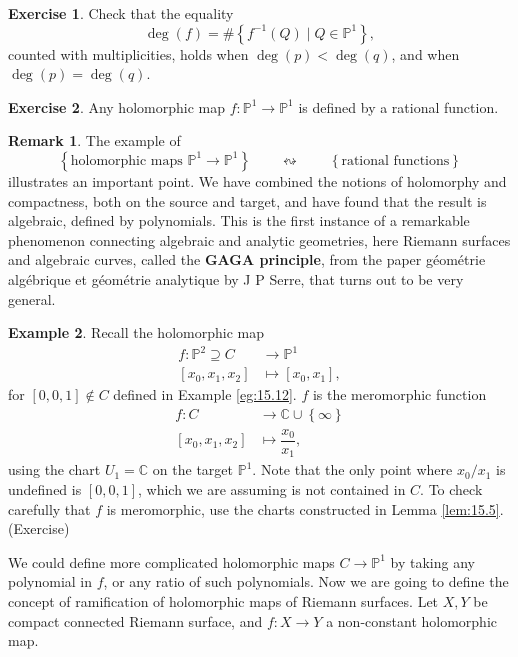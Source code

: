 \documentclass{article}
\newcommand{\C}{\mathbb{C}}
\renewcommand{\P}{\mathbb{P}}
\newcommand{\rb}[1]{\left( #1 \right)}
\renewcommand{\sb}[1]{\left[ #1 \right]}
\newcommand{\cb}[1]{\left\{ #1 \right\}}
\theoremstyle{definition}\newtheorem{definition}{Definition}[section]
\theoremstyle{definition}\newtheorem{notation}[definition]{Notation}
\theoremstyle{definition}\newtheorem{remark}[definition]{Remark}
\theoremstyle{definition}\newtheorem{example1}[definition]{Example}
\theoremstyle{definition}\newtheorem{fact}{Fact}
\theoremstyle{definition}\newtheorem{exercise}{Exercise}
\theoremstyle{definition}\newtheorem*{example2}{Example}
\begin{document}
\begin{exercise}
Check that the equality
$$ \deg\rb{f} = \#\cb{f^{-1}\rb{Q} \mid Q \in \P^1}, $$
counted with multiplicities, holds when $ \deg\rb{p} < \deg\rb{q} $, and when $ \deg\rb{p} = \deg\rb{q} $.
\end{exercise}

\begin{exercise}
Any holomorphic map $ f : \P^1 \to \P^1 $ is defined by a rational function.
\end{exercise}

\begin{remark}
The example of
$$ \cb{\text{holomorphic maps } \P^1 \to \P^1} \qquad \leftrightsquigarrow \qquad \cb{\text{rational functions}} $$
illustrates an important point. We have combined the notions of holomorphy and compactness, both on the source and target, and have found that the result is algebraic, defined by polynomials. This is the first instance of a remarkable phenomenon connecting algebraic and analytic geometries, here Riemann surfaces and algebraic curves, called the \textbf{GAGA principle}, from the paper g\'eom\'etrie alg\'ebrique et g\'eom\'etrie analytique by J P Serre, that turns out to be very general.
\end{remark}

\begin{example1}
Recall the holomorphic map
\begin{align*}
f : \P^2 \supseteq C & \to \P^1 \\
\sb{x_0, x_1, x_2} & \mapsto \sb{x_0, x_1},
\end{align*}
for $ \sb{0, 0, 1} \notin C $ defined in Example \ref{eg:15.12}. $ f $ is the meromorphic function
\begin{align*}
f : C & \to \C \cup \cb{\infty} \\
\sb{x_0, x_1, x_2} & \mapsto \dfrac{x_0}{x_1},
\end{align*}
using the chart $ U_1 = \C $ on the target $ \P^1 $. Note that the only point where $ x_0 / x_1 $ is undefined is $ \sb{0, 0, 1} $, which we are assuming is not contained in $ C $. To check carefully that $ f $ is meromorphic, use the charts constructed in Lemma \ref{lem:15.5}. (Exercise)
\end{example1}


We could define more complicated holomorphic maps $ C \to \P^1 $ by taking any polynomial in $ f $, or any ratio of such polynomials. Now we are going to define the concept of ramification of holomorphic maps of Riemann surfaces. Let $ X, Y $ be compact connected Riemann surface, and $ f : X \to Y $ a non-constant holomorphic map.
\end{document}
